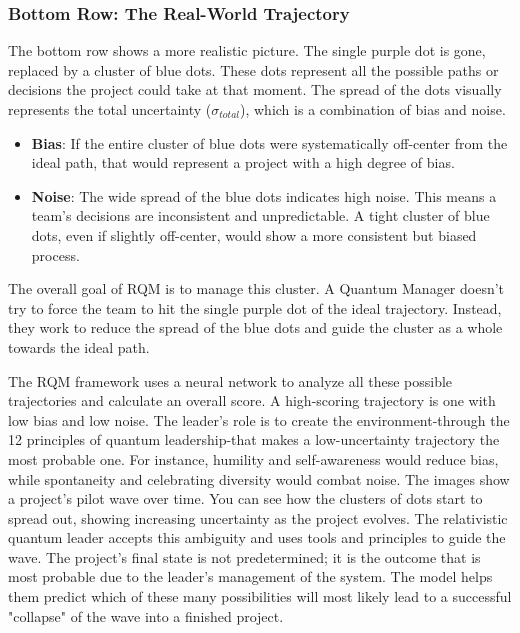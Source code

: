 \documentclass{article}
\begin{document}
\subsubsection*{Bottom Row: The Real-World Trajectory}
The bottom row shows a more realistic picture. The single purple dot is gone, replaced by a cluster of blue dots. These dots represent all the possible paths or decisions the project could take at that moment. The spread of the dots visually represents the total uncertainty ($\sigma_{total}$), which is a combination of bias and noise.
\begin{itemize}
\item \textbf{Bias}: If the entire cluster of blue dots were systematically off-center from the ideal path, that would represent a project with a high degree of bias.
\item \textbf{Noise}: The wide spread of the blue dots indicates high noise. This means a team's decisions are inconsistent and unpredictable. A tight cluster of blue dots, even if slightly off-center, would show a more consistent but biased process.
\end{itemize}
The overall goal of RQM is to manage this cluster. A Quantum Manager doesn't try to force the team to hit the single purple dot of the ideal trajectory. Instead, they work to reduce the spread of the blue dots and guide the cluster as a whole towards the ideal path.


The RQM framework uses a neural network to analyze all these possible trajectories and calculate an overall score. A high-scoring trajectory is one with low bias and low noise. The leader's role is to create the environment-through the 12 principles of quantum leadership-that makes a low-uncertainty trajectory the most probable one. For instance, humility and self-awareness would reduce bias, while spontaneity and celebrating diversity would combat noise. The images show a project's pilot wave over time. You can see how the clusters of dots start to spread out, showing increasing uncertainty as the project evolves. The relativistic quantum leader accepts this ambiguity and uses tools and principles to guide the wave. The project's final state is not predetermined; it is the outcome that is most probable due to the leader's management of the system. The model helps them predict which of these many possibilities will most likely lead to a successful "collapse" of the wave into a finished project.
\newpage
\end{document}
